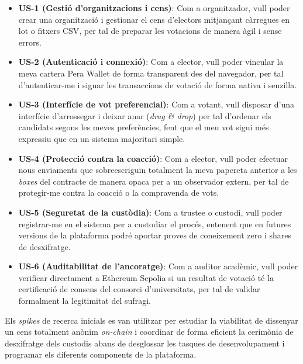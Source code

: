 \begin{itemize}
    \item \textbf{US-1 (Gestió d'organitzacions i cens)}: Com a organitzador, vull poder crear una organització i
    gestionar el cens d'electors mitjançant càrregues en lot o fitxers \ac{CSV}, per tal de preparar les votacions de
    manera àgil i sense errors.

    \item \textbf{US-2 (Autenticació i connexió)}: Com a elector, vull poder vincular la meva cartera Pera Wallet de
    forma transparent des del navegador, per tal d'autenticar-me i signar les transaccions de votació de forma nativa i
    senzilla.

    \item \textbf{US-3 (Interfície de vot preferencial)}: Com a votant, vull disposar d'una interfície d'arrossegar i
    deixar anar (\textit{drag \& drop}) per tal d'ordenar els candidats segons les meves preferències, fent que el meu
    vot sigui més expressiu que en un sistema majoritari simple.

    \item \textbf{US-4 (Protecció contra la coacció)}: Com a elector, vull poder efectuar nous enviaments que
    sobreescriguin totalment la meva papereta anterior a les \textit{boxes} del contracte de manera opaca per a un
    observador extern, per tal de protegir-me contra la coacció o la compravenda de vots.

    \item \textbf{US-5 (Seguretat de la custòdia)}: Com a trustee o custodi, vull poder registrar-me en el sistema per a
    custodiar el procés, entenent que en futures versions de la plataforma podré aportar proves de coneixement zero i
    shares de desxifratge.

    \item \textbf{US-6 (Auditabilitat de l'ancoratge)}: Com a auditor acadèmic, vull poder verificar directament a
    Ethereum Sepolia si un resultat de votació té la certificació de consens del consorci d'universitats, per tal de
    validar formalment la legitimitat del sufragi.
\end{itemize}

Els \textit{spikes} de recerca inicials es van utilitzar per estudiar la viabilitat de dissenyar un cens totalment
anònim \textit{on-chain} i coordinar de forma eficient la cerimònia de desxifratge dels custodis abans de desglossar les
tasques de desenvolupament i programar els diferents components de la plataforma.


